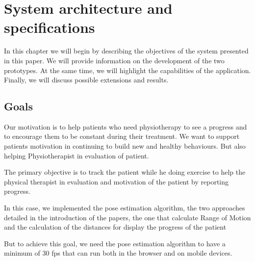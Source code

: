 
\chapter{System architecture and specifications}




In this chapter we will begin by describing the objectives of the system presented in this paper. 
We will provide information on the development of the two prototypes. 
At the same time, we will highlight the capabilities of the application. Finally, we will discuss possible extensions and results.

\section{Goals}

\par Our motivation is to help patients who need physiotherapy to see a progress and to encourage them to be 
constant during their treatment. We want to support patients motivation in continuing to build new and 
 healthy behaviours. But also helping Physiotherapist in evaluation of patient.

The primary objective is to track the patient while he doing exercise to help 
the physical therapist in evaluation and  motivation of the patient by reporting progress.


In this case, we implemented the pose estimation algorithm, 
the two approaches detailed in the introduction of the papers, 
the one that calculate Range of Motion  and the calculation of the distances for display the progress of the patient

But to achieve this goal, 
we need the pose estimation algorithm to have a minimum of 30 fps that can run both in the browser and on mobile devices.

